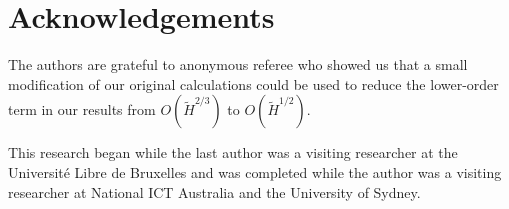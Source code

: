 \documentclass[acmtalg]{acmsmall}
\begin{document}
\section*{Acknowledgements}

The authors are grateful to anonymous referee who showed us that a small
modification of our original calculations could be used to reduce the
lower-order term in our results from $O(\tilde H^{2/3})$ to $O(\tilde
H^{1/2})$.

This research began while the last author was a visiting researcher at
the Universit\'e Libre de Bruxelles and was completed while
 the author was a visiting researcher at National ICT
Australia and the University of Sydney.



\end{document}
